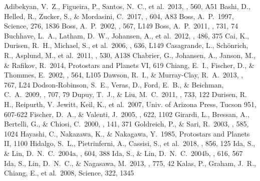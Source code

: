\documentclass[twocolumn, dvipdfmx]{aastex62}
\begin{document}
\begin{CJK*}{UTF8}{min}
\begin{thebibliography}{}
 Adibekyan, V.~Z., Figueira, P., Santos, N.~C., et al.\ 2013, \aap, 560, A51
 Bashi, D., Helled, R., Zucker, S., \& Mordasini, C.\ 2017, \aap, 604, A83
 Boss, A.~P.\ 1997, Science, 276, 1836
 Boss, A.~P.\ 2002, \apjl, 567, L149
 Boss, A.~P.\ 2011, \apj, 731, 74
 Buchhave, L.~A., Latham, D.~W., Johansen, A., et al.\ 2012, \nat, 486, 375
 Cai, K., Durisen, R.~H., Michael, S., et al.\ 2006, \apjl, 636, L149
 Casagrande, L., Sch{\"o}nrich, R., Asplund, M., et al.\ 2011, \aap, 530, A138
 Chabrier, G., Johansen, A., Janson, M., \& Rafikov, R.\ 2014, Protostars and Planets VI, 619
 Chiang, E.~I., Fischer, D., \& Thommes, E.\ 2002, \apjl, 564, L105
 Dawson, R.~I., \& Murray-Clay, R.~A.\ 2013, \apjl, 767, L24
 Dodson-Robinson, S.~E., Veras, D., Ford, E.~B., \& Beichman, C.~A.\ 2009, \apj, 707, 79
 Dupuy, T.~J., \& Liu, M.~C.\ 2011, \apj, 733, 122
 Durisen, R. H., Reipurth, V. Jewitt, Keil, K., et al.\ 2007, Univ. of Arizona Press, Tucson 951, 607-622
 Fischer, D.~A., \& Valenti, J.\ 2005, \apj, 622, 1102
 Girardi, L., Bressan, A., Bertelli, G., \& Chiosi, C.\ 2000, \aaps, 141, 371
 Goldreich, P., \& Sari, R.\ 2003, \apj, 585, 1024
 Hayashi, C., Nakazawa, K., \& Nakagawa, Y.\ 1985, Protostars and Planets II, 1100
 Hidalgo, S.~L., Pietrinferni, A., Cassisi, S., et al.\ 2018, \apj, 856, 125
 Ida, S., \& Lin, D.~N.~C.\ 2004a, \apj, 604, 388
 Ida, S., \& Lin, D.~N.~C.\ 2004b, \apj, 616, 567
 Ida, S., Lin, D.~N.~C., \& Nagasawa, M.\ 2013, \apj, 775, 42
 Kalas, P., Graham, J.~R., Chiang, E., et al.\ 2008, Science, 322, 1345

\end{thebibliography}
\end{CJK*}
\end{document}
